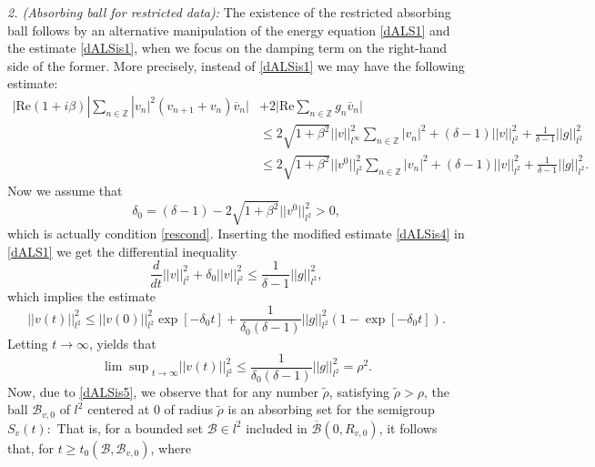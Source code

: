 \documentclass[preprintnumbers,amsmath,amssymb]{revtex4}
\begin{document}
\textit {2. (Absorbing ball for restricted data):} The existence of the restricted absorbing ball follows by an alternative manipulation of the energy equation  \eqref{dALS1} and the estimate \eqref{dALSis1},  when we focus on the damping term on the right-hand side of the former. More precisely, instead of \eqref{dALSis1} we may have the following estimate: 
\begin{equation}
	\label{dALSis4}
	\begin{split}
		\bigg| \mathrm{Re}(1+i\beta)|\sum_{n\in\mathbb{Z}}|v_n|^2(v_{n+1}+v_n)\overline{v}_n\bigg|&+2\bigg|\mathrm{Re}\sum_{n\in\mathbb{Z}}g_n\overline{v}_n\bigg|\\
		&\leq 2\sqrt{1+\beta^2}||v||^2_{l^{\infty}}\sum_{n\in\mathbb{Z}}|v_n|^2+(\delta-1)||v||^2_{l^2}+\frac{1}{\delta-1}|| g||_{l^2}^2\\
		&\leq 2\sqrt{1+\beta^2}||v^0||^2_{l^2}\sum_{n\in\mathbb{Z}}|v_n|^2+(\delta-1)||v||^2_{l^2}+\frac{1}{\delta-1}||g||_{l^2}^2.
	\end{split}
\end{equation}
Now we assume that 
\begin{equation*}
	\label{rescon}
	\delta_0=(\delta -1)-2\sqrt{1+\beta^2}||v^0||^2_{l^2}>0,
\end{equation*}
which is actually condition \eqref{rescond}.
Inserting the modified estimate \eqref{dALSis4} in \eqref{dALS1} we get the differential inequality
\begin{equation*}
	\frac{d}{dt}||v||_{l^2}^2+\delta_0||v||_{l^2}^2\leq \frac{1}{\delta-1}||g||_{l^2}^2,
\end{equation*}
which implies the estimate 
\begin{equation*}
|| v(t)||_{l^2}^2\le || v(0)||_{l^2}^2\exp[-\delta_0 t]+\frac{1}{\delta_0(\delta-1)}|| g||_{l^2}^2\left(1-\exp[-\delta_0 t]\right).
\end{equation*}
Letting $t\rightarrow \infty$, yields that
\begin{equation}
\label{dALSis5}
{\lim\sup}_{t \rightarrow \infty} || v(t)||_{l^2}^2\le \frac{1}{\delta_0(\delta-1)}|| g||_{l^2}^2=\rho^2.
\end{equation}
Now, due to \eqref{dALSis5}, we observe  that for any number $\tilde{\rho}$, satisfying $\tilde{\rho}>\rho$, the ball $\mathcal{B}_{v,0}$ of $l^2$ centered at $0$ of radius $\tilde{\rho}$ is an absorbing set for the semigroup $S_v(t):$ That is, for a bounded set  
$\mathcal{B}\in l^2$  included in $\overline{\mathcal{B}}(0,{R_{v,0}})$, it follows that, for $t\ge t_0(\mathcal{B},\mathcal{B}_{v,0})$, where 
\end{document}
